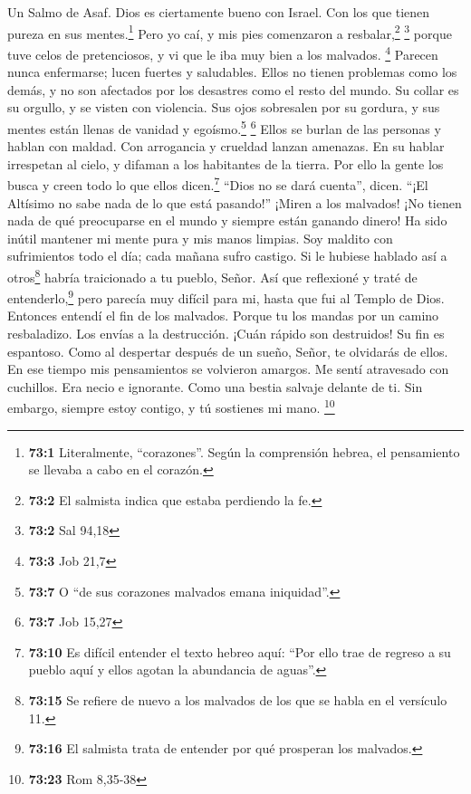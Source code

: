 Un Salmo de Asaf.  Dios es ciertamente bueno con Israel.
Con los que tienen pureza en sus mentes.\footnote{\textbf{73:1}
  Literalmente, ``corazones''. Según la comprensión hebrea, el
  pensamiento se llevaba a cabo en el corazón.}  Pero yo
caí, y mis pies comenzaron a resbalar,\footnote{\textbf{73:2} El
  salmista indica que estaba perdiendo la fe.} \footnote{\textbf{73:2}
  Sal 94,18}  porque tuve celos de pretenciosos, y vi que
le iba muy bien a los malvados. \footnote{\textbf{73:3} Job 21,7}
 Parecen nunca enfermarse; lucen fuertes y saludables.
 Ellos no tienen problemas como los demás, y no son
afectados por los desastres como el resto del mundo.  Su
collar es su orgullo, y se visten con violencia.  Sus ojos
sobresalen por su gordura, y sus mentes están llenas de vanidad y
egoísmo.\footnote{\textbf{73:7} O ``de sus corazones malvados emana
  iniquidad''.} \footnote{\textbf{73:7} Job 15,27}  Ellos
se burlan de las personas y hablan con maldad. Con arrogancia y crueldad
lanzan amenazas.  En su hablar irrespetan al cielo, y
difaman a los habitantes de la tierra.  Por ello la gente
los busca y creen todo lo que ellos dicen.\footnote{\textbf{73:10} Es
  difícil entender el texto hebreo aquí: ``Por ello trae de regreso a su
  pueblo aquí y ellos agotan la abundancia de aguas''.} 
``Dios no se dará cuenta'', dicen. ``¡El Altísimo no sabe nada de lo que
está pasando!''  ¡Miren a los malvados! ¡No tienen nada
de qué preocuparse en el mundo y siempre están ganando dinero!
 Ha sido inútil mantener mi mente pura y mis manos
limpias.  Soy maldito con sufrimientos todo el día; cada
mañana sufro castigo.  Si le hubiese hablado así a
otros\footnote{\textbf{73:15} Se refiere de nuevo a los malvados de los
  que se habla en el versículo 11.} habría traicionado a tu pueblo,
Señor.  Así que reflexioné y traté de
entenderlo,\footnote{\textbf{73:16} El salmista trata de entender por
  qué prosperan los malvados.} pero parecía muy difícil para mi,
 hasta que fui al Templo de Dios. Entonces entendí el fin
de los malvados.  Porque tu los mandas por un camino
resbaladizo. Los envías a la destrucción.  ¡Cuán rápido
son destruidos! Su fin es espantoso.  Como al despertar
después de un sueño, Señor, te olvidarás de ellos.  En
ese tiempo mis pensamientos se volvieron amargos. Me sentí atravesado
con cuchillos.  Era necio e ignorante. Como una bestia
salvaje delante de ti.  Sin embargo, siempre estoy
contigo, y tú sostienes mi mano. \footnote{\textbf{73:23} Rom 8,35-38}


